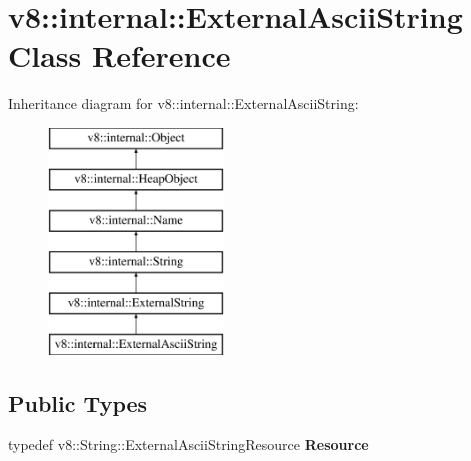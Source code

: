 \hypertarget{classv8_1_1internal_1_1_external_ascii_string}{}\section{v8\+:\+:internal\+:\+:External\+Ascii\+String Class Reference}
\label{classv8_1_1internal_1_1_external_ascii_string}
Inheritance diagram for v8\+:\+:internal\+:\+:External\+Ascii\+String\+:\begin{figure}[H]
\begin{center}
\leavevmode
\includegraphics[height=6.000000cm]{classv8_1_1internal_1_1_external_ascii_string}
\end{center}
\end{figure}
\subsection*{Public Types}
\begin{DoxyCompactItemize}
\item 
\hypertarget{classv8_1_1internal_1_1_external_ascii_string_a59ed6979e934fff70e416e70860cdb21}{}typedef v8\+::\+String\+::\+External\+Ascii\+String\+Resource {\bfseries Resource}\label{classv8_1_1internal_1_1_external_ascii_string_a59ed6979e934fff70e416e70860cdb21}

\end{DoxyCompactItemize}
